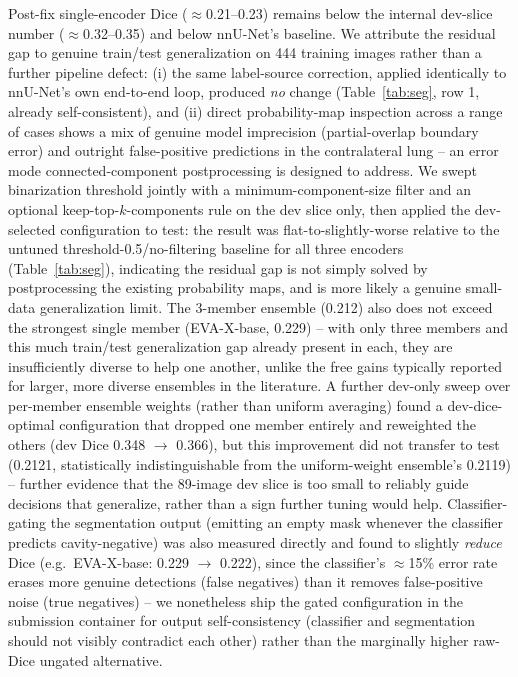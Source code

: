 \documentclass[runningheads]{llncs}
\begin{document}
Post-fix single-encoder Dice ($\approx$0.21--0.23) remains below the internal
dev-slice number ($\approx$0.32--0.35) and below nnU-Net's baseline. We
attribute the residual gap to genuine train/test generalization on 444
training images rather than a further pipeline defect: (i) the same
label-source correction, applied identically to nnU-Net's own end-to-end
loop, produced \emph{no} change (Table~\ref{tab:seg}, row 1, already
self-consistent), and (ii) direct probability-map inspection across a
range of cases shows a mix of genuine model imprecision (partial-overlap
boundary error) and outright false-positive predictions in the
contralateral lung -- an error mode connected-component postprocessing is
designed to address. We swept binarization threshold jointly with a
minimum-component-size filter and an optional keep-top-$k$-components rule
on the dev slice only, then applied the dev-selected configuration to test:
the result was flat-to-slightly-worse relative to the untuned
threshold-0.5/no-filtering baseline for all three encoders (Table~\ref{tab:seg}),
indicating the residual gap is not simply solved by postprocessing the
existing probability maps, and is more likely a genuine small-data
generalization limit. The 3-member ensemble (0.212) also does not exceed
the strongest single member (EVA-X-base, 0.229) -- with only three members
and this much train/test generalization gap already present in each, they
are insufficiently diverse to help one another, unlike the free gains
typically reported for larger, more diverse ensembles in the literature. A
further dev-only sweep over per-member ensemble weights (rather than uniform
averaging) found a dev-dice-optimal configuration that dropped one member
entirely and reweighted the others (dev Dice 0.348 $\to$ 0.366), but this
improvement did not transfer to test (0.2121, statistically indistinguishable
from the uniform-weight ensemble's 0.2119) -- further evidence that the
89-image dev slice is too small to reliably guide decisions that generalize,
rather than a sign further tuning would help. Classifier-gating the
segmentation output (emitting an empty mask whenever the classifier predicts
cavity-negative) was also measured directly and found to slightly
\emph{reduce} Dice (e.g.\ EVA-X-base: 0.229 $\to$ 0.222), since the
classifier's $\approx$15\% error rate erases more genuine detections (false
negatives) than it removes false-positive noise (true negatives) -- we
nonetheless ship the gated configuration in the submission container for
output self-consistency (classifier and segmentation should not visibly
contradict each other) rather than the marginally higher raw-Dice ungated
alternative.
\end{document}

